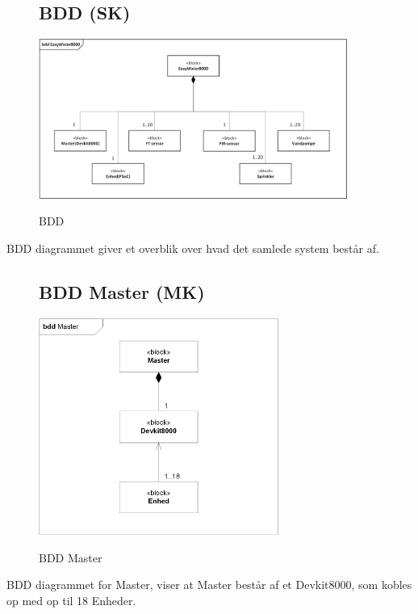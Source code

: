 \begin{figure}[H] \centering
\subsection{BDD (SK)}
{\includegraphics[width=0.9\textwidth]{filer/systemarkitektur/BDD}}
\caption{BDD}
\label{lab:bdd}
\raggedright
\end{figure}
BDD diagrammet giver et overblik over hvad det samlede system består af. \newline \newline

\begin{figure}[H] \centering
\subsection{BDD Master (MK)}
{\includegraphics[width=0.7\textwidth]{filer/systemarkitektur/BDD_Master}}
\caption{BDD Master}
\label{lab:bddmaster}
\raggedright
\end{figure}
BDD diagrammet for Master, viser at Master består af et Devkit8000, som kobles op med op til 18 Enheder.

